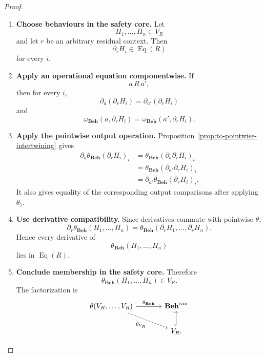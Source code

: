 \begin{proof}
    \leavevmode
    \begin{enumerate}
        \item \textbf{Choose behaviours in the safety core.}
        Let
        \[
            H_1,\dots,H_n\in V_R
        \]
        and let \(r\) be an arbitrary residual context. Then
        \[
            \partial_rH_i\in\operatorname{Eq}(R)
        \]
        for every \(i\).

        \item \textbf{Apply an operational equation componentwise.}
        If
        \[
            a\,R\,a',
        \]
        then for every \(i\),
        \[
            \partial_a(\partial_rH_i)
            =
            \partial_{a'}(\partial_rH_i)
        \]
        and
        \[
            \omega_{\mathbf{Beh}}(a,\partial_rH_i)
            =
            \omega_{\mathbf{Beh}}(a',\partial_rH_i).
        \]

        \item \textbf{Apply the pointwise output operation.}
        Proposition~\ref{prop:to-pointwise-intertwining} gives
        \[
        \begin{aligned}
            \partial_a
            \theta_{\mathbf{Beh}}(\partial_rH_i)_i
            &=
            \theta_{\mathbf{Beh}}
            (\partial_a\partial_rH_i)_i
            \\
            &=
            \theta_{\mathbf{Beh}}
            (\partial_{a'}\partial_rH_i)_i
            \\
            &=
            \partial_{a'}
            \theta_{\mathbf{Beh}}(\partial_rH_i)_i.
        \end{aligned}
        \]
        It also gives equality of the corresponding output comparisons after
        applying \(\theta_1\).

        \item \textbf{Use derivative compatibility.}
        Since derivatives commute with pointwise \(\theta\),
        \[
            \partial_r
            \theta_{\mathbf{Beh}}(H_1,\dots,H_n)
            =
            \theta_{\mathbf{Beh}}
            (\partial_rH_1,\dots,\partial_rH_n).
        \]
        Hence every derivative of
        \[
            \theta_{\mathbf{Beh}}(H_1,\dots,H_n)
        \]
        lies in \(\operatorname{Eq}(R)\).

        \item \textbf{Conclude membership in the safety core.}
        Therefore
        \[
            \theta_{\mathbf{Beh}}(H_1,\dots,H_n)
            \in V_R.
        \]
        The factorization is
        \[
        \begin{tikzcd}[column sep=large]
            \theta(V_R,\dots,V_R)
                \arrow[r, "\theta_{\mathbf{Beh}}"]
                \arrow[dr, dashed, "\theta_{V_R}"']
            &
            \mathbf{Beh}^{\mathrm{can}}
            \\
            &
            V_R
                \arrow[u, hook].
        \end{tikzcd}
        \]


\end{enumerate}
\end{proof}

